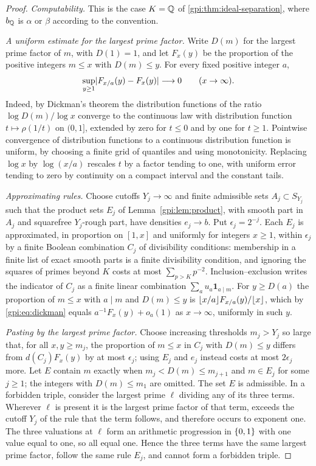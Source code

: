 \begin{proof}
\emph{Computability.} This is the case $K=\mathbb{Q}$ of \cref{gpi:thm:ideal-separation}, where $b_{\mathbb{Q}}$
is $\alpha$ or $\beta$ according to the convention.

\emph{A uniform estimate for the largest prime factor.} Write $D(m)$ for the largest prime
factor of $m$, with $D(1)=1$, and let $F_x(y)$ be the proportion of the positive integers
$m\le x$ with $D(m)\le y$. For every fixed positive integer $a$,
\begin{equation}\label{gpi:eq:dickman}
 \sup_{y\ge1}\lvert F_{x/a}(y)-F_x(y)\rvert\longrightarrow0\qquad(x\to\infty).
\end{equation}
Indeed, by Dickman's theorem \cite{Dickman1930Frequency,GranvilleSmooth} the distribution
functions of the ratio $\log D(m)/\log x$ converge to the continuous law with distribution
function $t\mapsto\rho(1/t)$ on $(0,1]$, extended by zero for $t\le0$ and by one for $t\ge1$.
Pointwise convergence of distribution functions to a continuous distribution function is
uniform, by choosing a finite grid of quantiles and using monotonicity. Replacing $\log x$ by
$\log(x/a)$ rescales $t$ by a factor tending to one, with uniform error tending to zero by
continuity on a compact interval and the constant tails.

\emph{Approximating rules.} Choose cutoffs $Y_j\to\infty$ and finite admissible sets
$A_j\subset S_{Y_j}$ such that the product sets $E_j$ of Lemma~\ref{gpi:lem:product}, with smooth
part in $A_j$ and squarefree $Y_j$-rough part, have densities $e_j\to b$. Put
$\epsilon_j=2^{-j}$. Each $E_j$ is approximated, in proportion on $[1,x]$ and uniformly for
integers $x\ge1$, within $\epsilon_j$ by a finite Boolean combination $C_j$ of divisibility
conditions: membership in a finite list of exact smooth parts is a finite divisibility
condition, and ignoring the squares of primes beyond $K$ costs at most $\sum_{p>K}p^{-2}$.
Inclusion--exclusion writes the indicator of $C_j$ as a finite linear combination
$\sum_au_a\mathbf 1_{a\mid m}$. For $y\ge D(a)$ the proportion of $m\le x$ with $a\mid m$ and
$D(m)\le y$ is $\lfloor x/a\rfloor F_{x/a}(y)/\lfloor x\rfloor$, which by \eqref{gpi:eq:dickman} equals
$a^{-1}F_x(y)+o_a(1)$ as $x\to\infty$, uniformly in such $y$.

\emph{Pasting by the largest prime factor.} Choose increasing thresholds $m_j>Y_j$ so large
that, for all $x,y\ge m_j$, the proportion of $m\le x$ in $C_j$ with $D(m)\le y$ differs from
$d(C_j)F_x(y)$ by at most $\epsilon_j$; using $E_j$ and $e_j$ instead costs at most
$2\epsilon_j$ more. Let $E$ contain $m$ exactly when $m_j<D(m)\le m_{j+1}$ and $m\in E_j$
for some $j\ge1$; the integers with $D(m)\le m_1$ are omitted. The set $E$ is admissible. In
a forbidden triple, consider the largest prime $\ell$ dividing any of its three terms.
Wherever $\ell$ is present it is the largest prime factor of that term, exceeds the cutoff
$Y_j$ of the rule that the term follows, and therefore occurs to exponent one. The three
valuations at $\ell$ form an arithmetic progression in $\{0,1\}$ with one value equal to
one, so all equal one. Hence the three terms have the same largest prime factor, follow the
same rule $E_j$, and cannot form a forbidden triple.


\end{proof}
